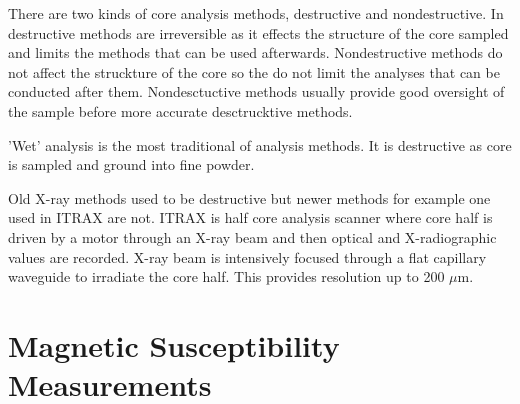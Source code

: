 \documentclass[12pt,a4paper,oneside,pdftex]{report}
\begin{document}
There are two kinds of core analysis methods, destructive and nondestructive. In destructive methods
are irreversible as it effects the structure of the core sampled and limits the methods that can be used
afterwards. Nondestructive methods do not affect the struckture of the core so the do not limit the 
analyses that can be conducted after them. Nondesctuctive methods usually provide good oversight of the
sample before more accurate desctrucktive methods.

'Wet' analysis is the most traditional of analysis methods. It is destructive as core is sampled and 
ground into fine powder. %

Old X-ray methods used to be destructive \cite{Croudace2006} but newer methods for 
example one used in ITRAX \cite{Croudace2006} are not. ITRAX is half core analysis scanner where core half is 
driven by a motor through an X-ray beam and then optical and X-radiographic values are recorded. 
X-ray beam is intensively focused through a flat capillary waveguide to irradiate the core half. 
This provides resolution up to 200 $\mu$m.%



\section{Magnetic Susceptibility Measurements}
\end{document}
